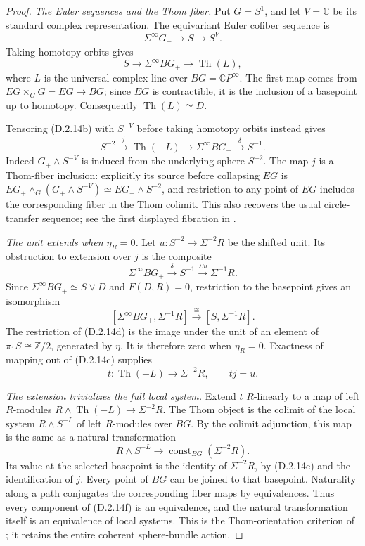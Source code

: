 \begin{proof}
\emph{The Euler sequences and the Thom fiber.}
Put $G=S^1$, and let $V=\mathbb C$ be its standard complex
representation. The equivariant Euler cofiber sequence is
\[
 \Sigma^\infty G_+\longrightarrow S\longrightarrow S^V.
 \tag{D.2.14b}
\]
Taking homotopy orbits gives
\[
 S\longrightarrow\Sigma^\infty BG_+
       \longrightarrow\operatorname{Th}(L),
\]
where $L$ is the universal complex line over $BG=\mathbb CP^\infty$.
The first map comes from $EG\times_GG=EG\to BG$; since $EG$ is
contractible, it is the inclusion of a basepoint up to homotopy.
Consequently $\operatorname{Th}(L)\simeq D$.

Tensoring \textup{(D.2.14b)} with $S^{-V}$ before taking homotopy
orbits instead gives
\[
 S^{-2}\xrightarrow{j}\operatorname{Th}(-L)
   \longrightarrow\Sigma^\infty BG_+
   \xrightarrow{\delta}S^{-1}.
 \tag{D.2.14c}
\]
Indeed $G_+\wedge S^{-V}$ is induced from the underlying sphere
$S^{-2}$. The map $j$ is a Thom-fiber inclusion: explicitly its source
before collapsing $EG$ is
$EG_+\wedge_G(G_+\wedge S^{-V})\simeq EG_+\wedge S^{-2}$,
and restriction to any point of $EG$ includes the corresponding
fiber in the Thom colimit. This also recovers the usual
circle-transfer sequence; see the first displayed fibration in
\cite[\S1]{EH5MadsenSchlichtkrull2000}.

\emph{The unit extends when $\eta_R=0$.}
Let $u:S^{-2}\to\Sigma^{-2}R$ be the shifted unit. Its obstruction to
extension over $j$ is the composite
\[
 \Sigma^\infty BG_+\xrightarrow{\delta}S^{-1}
      \xrightarrow{\Sigma u}\Sigma^{-1}R.
 \tag{D.2.14d}
\]
Since $\Sigma^\infty BG_+\simeq S\vee D$ and $F(D,R)=0$,
restriction to the basepoint gives an isomorphism
\[
 [\Sigma^\infty BG_+,\Sigma^{-1}R]
       \xrightarrow{\ \cong\ }[S,\Sigma^{-1}R].
\]
The restriction of \textup{(D.2.14d)} is the image under the unit of
an element of $\pi_1S\cong\mathbb Z/2$, generated by $\eta$.
It is therefore zero when $\eta_R=0$. Exactness of mapping out of
\textup{(D.2.14c)} supplies
\[
 t:\operatorname{Th}(-L)\longrightarrow\Sigma^{-2}R,
 \qquad t j=u.
 \tag{D.2.14e}
\]

\emph{The extension trivializes the full local system.}
Extend $t$ $R$-linearly to a map of left $R$-modules
$R\wedge\operatorname{Th}(-L)\to\Sigma^{-2}R$.
The Thom object is the colimit of the local system
$R\wedge S^{-L}$ of left $R$-modules over $BG$.
By the colimit adjunction, this map is the same as a natural
transformation
\[
 R\wedge S^{-L}\longrightarrow
          \operatorname{const}_{BG}(\Sigma^{-2}R).
 \tag{D.2.14f}
\]
Its value at the selected basepoint is the identity of
$\Sigma^{-2}R$, by \textup{(D.2.14e)} and the identification of $j$.
Every point of $BG$ can be joined to that basepoint. Naturality along
a path conjugates the corresponding fiber maps by equivalences.
Thus every component of \textup{(D.2.14f)} is an equivalence, and the
natural transformation itself is an equivalence of local systems.
This is the Thom-orientation criterion of
\cite[Definitions 2.20 and 2.22, Theorem 2.24]{EH5ABGHR2014}; it
retains the entire coherent sphere-bundle action.


\end{proof}
